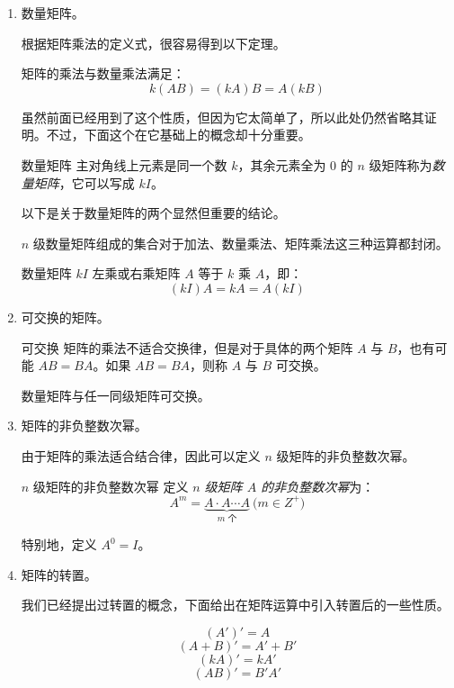 \begin{enumerate}
	\item 数量矩阵。

	根据矩阵乘法的定义式，很容易得到以下定理。

	\begin{theorem}
		矩阵的乘法与数量乘法满足：
		$$
		k(AB) = (kA)B = A(kB)
		$$
	\end{theorem}

	虽然前面已经用到了这个性质，但因为它太简单了，所以此处仍然省略其证明。不过，下面这个在它基础上的概念却十分重要。

	\begin{definition}{数量矩阵}
		主对角线上元素是同一个数 $k$，其余元素全为 $0$ 的 $n$ 级矩阵称为\emph{数量矩阵}，它可以写成 $kI$。
	\end{definition}

	以下是关于数量矩阵的两个显然但重要的结论。

	\begin{theorem}[数量矩阵的运算封闭性]
		$n$ 级数量矩阵组成的集合对于加法、数量乘法、矩阵乘法这三种运算都封闭。
	\end{theorem}

	\begin{theorem}
		数量矩阵 $kI$ 左乘或右乘矩阵 $A$ 等于 $k$ 乘 $A$，即：
		$$
		(kI)A = kA = A(kI)
		$$
	\end{theorem}

	\item 可交换的矩阵。

	\begin{definition}{可交换}
		矩阵的乘法不适合交换律，但是对于具体的两个矩阵 $A$ 与 $B$，也有可能 $AB = BA$。如果 $AB = BA$，则称 $A$ 与 $B$ 可交换。
	\end{definition}

	\begin{theorem}
		数量矩阵与任一同级矩阵可交换。
	\end{theorem}

	\item 矩阵的非负整数次幂。

	由于矩阵的乘法适合结合律，因此可以定义 $n$ 级矩阵的非负整数次幂。

	\begin{definition}{$n$ 级矩阵的非负整数次幂}
		定义 \emph{$n$ 级矩阵 $A$ 的非负整数次幂}为：
		$$
		A^m = \underset{\text{$m$ 个}}{\underbrace{A \cdot A \cdots A}} \pod{m \in Z^+}
		$$

		特别地，定义 $A^0 = I$。
	\end{definition}

	\item 矩阵的转置。

	我们已经提出过转置的概念，下面给出在矩阵运算中引入转置后的一些性质。

	\begin{theorem}
		$$
		(A')' = A
		$$$$
		(A + B)' = A' + B'
		$$$$
		(kA)' = kA'
		$$$$
		(AB)' = B'A'
		$$
	\end{theorem}
\end{enumerate}